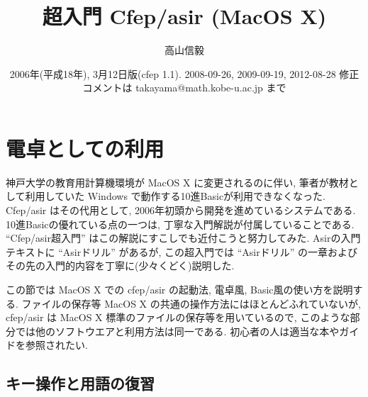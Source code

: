\documentclass{jbook}
\title{ {\bf 超入門 Cfep/asir (MacOS X)} }
\author{  高山信毅 }
\date{ 2006年(平成18年), 3月12日版(cfep 1.1). 2008-09-26, 2009-09-19, 2012-08-28 修正 \\ コメントは takayama@math.kobe-u.ac.jp まで}
\begin{document}
\maketitle
\tableofcontents

\chapter{ 電卓としての利用 }  \label{chapter:next}

神戸大学の教育用計算機環境が MacOS X に変更されるのに伴い,
筆者が教材として利用していた Windows で動作する10進Basicが利用できなくなった.
Cfep/asir はその代用として, 
2006年初頭から開発を進めているシステムである.
10進Basicの優れている点の一つは, 丁寧な入門解説が付属していることである.
``Cfep/asir超入門'' はこの解説にすこしでも近付こうと努力してみた.
Asirの入門テキストに ``Asirドリル'' があるが, この超入門では ``Asirドリル''
の一章およびその先の入門的内容を丁寧に(少々くどく)説明した.

\bigbreak

この節では MacOS X での cfep/asir の起動法, 電卓風, Basic風の使い方を説明する.
ファイルの保存等 MacOS X の共通の操作方法にはほとんどふれていないが,
cfep/asir は MacOS X 標準のファイルの保存等を用いているので,
このような部分では他のソフトウエアと利用方法は同一である.
初心者の人は適当な本やガイドを参照されたい.


\section{キー操作と用語の復習}
\end{document}
